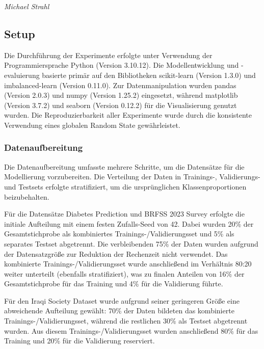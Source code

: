 \documentclass[10pt]{scrartcl}
\begin{document}
\begin{flushright}
  \footnotesize\textit{Michael Strahl}
\end{flushright}



\subsection{Setup}
Die Durchführung der Experimente erfolgte unter Verwendung der Programmiersprache Python (Version 3.10.12). Die Modellentwicklung und -evaluierung basierte primär auf den Bibliotheken scikit-learn (Version 1.3.0) und imbalanced-learn (Version 0.11.0). Zur Datenmanipulation wurden pandas (Version 2.0.3) und numpy (Version 1.25.2) eingesetzt, während matplotlib (Version 3.7.2) und seaborn (Version 0.12.2) für die Visualisierung genutzt wurden. Die Reproduzierbarkeit aller Experimente wurde durch die konsistente Verwendung eines globalen Random State gewährleistet.

\subsubsection{Datenaufbereitung}
\label{sec:datenaufbereitung}

Die Datenaufbereitung umfasste mehrere Schritte, um die Datensätze für die Modellierung vorzubereiten. Die Verteilung der Daten in Trainings-, Validierungs- und Testsets erfolgte stratifiziert, um die ursprünglichen Klassenproportionen beizubehalten.

Für die Datensätze Diabetes Prediction \cite{mustafa2023} und BRFSS 2023 Survey \cite{BRFSS2023} erfolgte die initiale Aufteilung mit einem festen Zufalls-Seed von 42. Dabei wurden 20\% der Gesamtstichprobe als kombiniertes Trainings-/Validierungsset und 5\% als separates Testset abgetrennt. Die verbleibenden 75\% der Daten wurden aufgrund der Datensatzgröße zur Reduktion der Rechenzeit nicht verwendet. Das kombinierte Trainings-/Validierungsset wurde anschließend im Verhältnis 80:20 weiter unterteilt (ebenfalls stratifiziert), was zu finalen Anteilen von 16\% der Gesamtstichprobe für das Training und 4\% für die Validierung führte.

Für den Iraqi Society Dataset \cite{rashid2020} wurde aufgrund seiner geringeren Größe eine abweichende Aufteilung gewählt: 70\% der Daten bildeten das kombinierte Trainings-/Validierungsset, während die restlichen 30\% als Testset abgetrennt wurden. Aus diesem Trainings-/Validierungsset wurden anschließend 80\% für das Training und 20\% für die Validierung reserviert.
\end{document}

